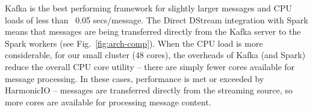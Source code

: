 \documentclass[letterpaper,conference]{IEEEtran}
\begin{document}
Kafka is the best performing framework for slightly larger messages and CPU loads of less than ~0.05 secs/message.
The Direct DStream integration with Spark means that messages are being transferred directly from the Kafka server to the Spark workers (see Fig.~\ref{fig:arch-comp}).  
When the CPU load is more considerable, for our small cluster (48 cores), the overheads of Kafka (and Spark) reduce the overall CPU core utility -- there are simply fewer cores available for message processing. %
In these cases, performance is met or exceeded by HarmonicIO -- messages are transferred directly from the streaming source, so more cores are available for processing message content.



\end{document}

